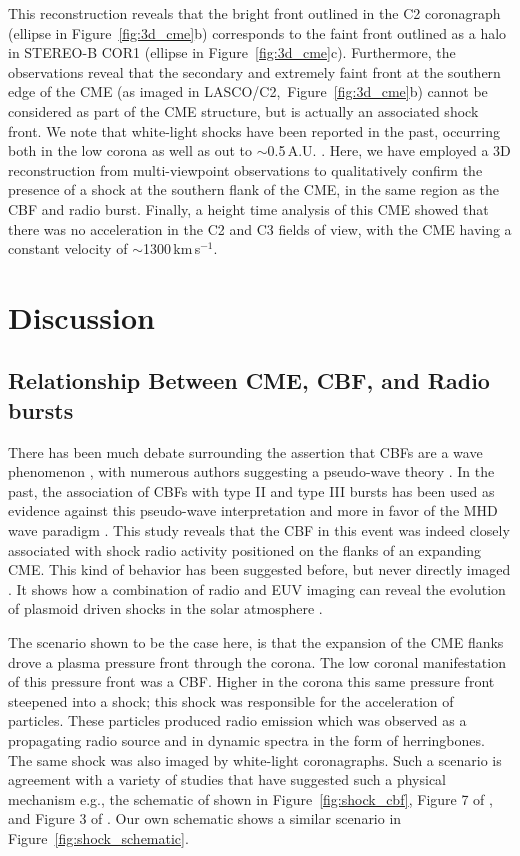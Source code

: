 This reconstruction reveals that the bright front outlined in the C2 coronagraph (ellipse in Figure~\ref{fig:3d_cme}b) corresponds to the faint front outlined as a halo in STEREO-B COR1 (ellipse in Figure~\ref{fig:3d_cme}c). Furthermore, the observations reveal that the secondary and extremely faint front at the southern edge of the CME (as imaged in LASCO/C2,~Figure~\ref{fig:3d_cme}b) cannot be considered as part of the CME structure, but is actually an associated shock front. We note that white-light shocks have been reported in the past, occurring both in the low corona as well as out to $\sim$0.5\,A.U. \citep{vourlidas2012, maloney2011}. Here, we have employed a 3D reconstruction from multi-viewpoint observations to qualitatively confirm the presence of a shock at the southern flank of the CME, in the same region as the CBF and radio burst. Finally, a height time analysis of this CME showed that there was no acceleration in the C2 and C3 fields of view, with the CME having a constant velocity of $\sim$1300\,km\,s$^{-1}$.


\section{Discussion}

\subsection{Relationship Between CME, CBF, and Radio bursts}\label{sec:31}

There has been much debate surrounding the assertion that CBFs are a wave phenomenon \citep{gallagher2011}, with numerous authors suggesting a pseudo-wave theory \citep{delannee2008}. In the past, the association of CBFs with type II and type III bursts has been used as evidence against this pseudo-wave interpretation and more in favor of the MHD wave paradigm \citep{warmuth2004b, grechnev2011}. This study reveals that the CBF in this event was indeed closely associated with shock radio activity positioned on the flanks of an expanding CME. This kind of behavior has been suggested before, but never directly imaged \citep{kozarev2011, feng2012, feng2013}. It shows how a combination of radio and EUV imaging can reveal the evolution of plasmoid driven shocks in the solar atmosphere \citep{bain2012}.

The scenario shown to be the case here, is that the expansion of the CME flanks drove a plasma pressure front through the corona. The low coronal manifestation of this pressure front was a CBF. Higher in the corona this same pressure front steepened into a shock; this shock was responsible for the acceleration of particles. These particles produced radio emission which was observed as a propagating radio source and in dynamic spectra in the form of herringbones. The same shock was also imaged by white-light coronagraphs. Such a scenario is agreement with a variety of studies that have suggested such a physical mechanism e.g., the schematic of \citep{grechnev2011a} shown in Figure~\ref{fig:shock_cbf}, Figure 7 of \citet{warmuth2004b}, and Figure 3 of \citep{stewart1980}. Our own schematic shows a similar scenario in Figure~\ref{fig:shock_schematic}.


